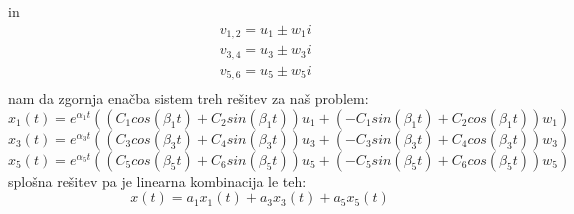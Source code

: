 \documentclass[a4paper, 12pt]{article}
\begin{document}
in
\begin{align*}
	&v_{1,2} = u_{1} \pm w_{1}i \\
	&v_{3,4} = u_{3} \pm w_{3}i \\
	&v_{5,6} = u_{5} \pm w_{5}i \\
\end{align*}
nam da zgornja enačba sistem treh rešitev za naš problem:
\begin{equation}
	x_{1}(t) = e^{\alpha_{1} t}((C_{1}cos(\beta_{1} t)+C_{2}sin(\beta_{1} t))u_{1}+(-C_{1}sin(\beta_{1} t)+C_{2}cos(\beta_{1} t))w_{1})
\end{equation}
\begin{equation}
	x_{3}(t) = e^{\alpha_{3} t}((C_{3}cos(\beta_{3} t)+C_{4}sin(\beta_{3} t))u_{3}+(-C_{3}sin(\beta_{3} t)+C_{4}cos(\beta_{3} t))w_{3})
\end{equation}
\begin{equation}
	x_{5}(t) = e^{\alpha_{5} t}((C_{5}cos(\beta_{5} t)+C_{6}sin(\beta_{5} t))u_{5}+(-C_{5}sin(\beta_{5} t)+C_{6}cos(\beta_{5} t))w_{5})
\end{equation}
splošna rešitev pa je linearna kombinacija le teh:
\begin{equation}
	x(t) = a_{1}x_{1}(t) + a_{3}x_{3}(t) + a_{5}x_{5}(t)
\end{equation}
\end{document}
